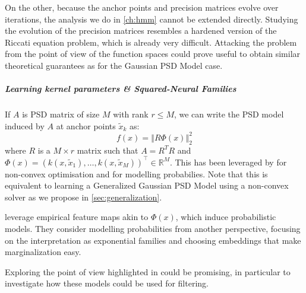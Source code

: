On the other, because the anchor points and precision matrices evolve over iterations, the analysis we do in \cref{ch:hmm} cannot be extended directly. Studying the evolution of the precision matrices resembles a hardened version of the Riccati equation problem, which is already very difficult. Attacking the problem from the point of view of the function spaces could prove useful to obtain similar theoretical guarantees as for the Gaussian PSD Model case.

\subparagraph{Learning kernel parameters \& Squared-Neural Families} If $A$ is PSD matrix of size $M$ with rank $r \leq M$, we can write the PSD model induced by $A$ at anchor points $\tilde x_k$ as:
\begin{equation}
    f(x) = \left\Vert R\Phi(x)\right\Vert_2^2
\end{equation}
where $R$ is a $M \times r$ matrix such that $A = R^T R$ and $\Phi(x) = (k(x, \tilde x_1), \ldots, k(x, \tilde x_M))^\top\in\mathbb R^M$. This has been leveraged by \citet{gaspard} for non-convex optimisation and \citet{squared-neural-families} for modelling probabilies. Note that this is equivalent to learning a Generalized Gaussian PSD Model using a non-convex solver as we propose in \cref{sec:generalization}.

\cite{squared-neural-families} leverage empirical feature maps akin to $\Phi(x)$, which induce probabilistic models. They consider modelling probabilities from another perspective, focusing on the interpretation as exponential families and choosing embeddings that make marginalization easy.

Exploring the point of view highlighted in \cite{squared-neural-families} could be promising, in particular to investigate how these models could be used for filtering.
